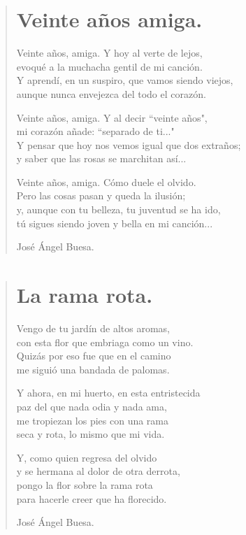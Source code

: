 \documentclass[11pt, portrait, twoside, notitlepage, openright]{book}
\begin{document}
\newpage
\begin{verse}
\begin{center}
\section{Veinte años amiga.}
\end{center}
Veinte años, amiga. Y hoy al verte de lejos,\\
evoqué a la muchacha gentil de mi canción.\\
Y aprendí, en un suspiro, que vamos siendo viejos,\\
aunque nunca envejezca del todo el corazón.
\newline

Veinte años, amiga. Y al decir ``veinte años",\\
mi corazón añade: ``separado de ti..."\\
Y pensar que hoy nos vemos igual que dos extraños;\\
y saber que las rosas se marchitan así...
\newline

Veinte años, amiga. Cómo duele el olvido.\\
Pero las cosas pasan y queda la ilusión;\\
y, aunque con tu belleza, tu juventud se ha ido,\\
tú sigues siendo joven y bella en mi canción...
\newline

José Ángel Buesa.
\end{verse}

\newpage
\begin{verse}
\begin{center}
\section{La rama rota.}
\end{center}
Vengo de tu jardín de altos aromas,\\
con esta flor que embriaga como un vino.\\
Quizás por eso fue que en el camino\\
me siguió una bandada de palomas.
\newline

Y ahora, en mi huerto, en esta entristecida\\
paz del que nada odia y nada ama,\\
me tropiezan los pies con una rama\\
seca y rota, lo mismo que mi vida.
\newline

Y, como quien regresa del olvido\\
y se hermana al dolor de otra derrota,\\
pongo la flor sobre la rama rota\\
para hacerle creer que ha florecido.
\newline

José Ángel Buesa.
\end{verse}
\end{document}

